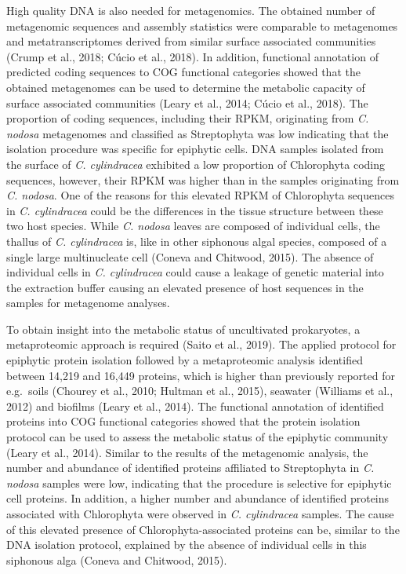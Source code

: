 \documentclass[12pt,]{article}
\begin{document}
High quality DNA is also needed for metagenomics. The obtained number of
metagenomic sequences and assembly statistics were comparable to
metagenomes and metatranscriptomes derived from similar surface
associated communities (Crump et al., 2018; Cúcio et al., 2018). In
addition, functional annotation of predicted coding sequences to COG
functional categories showed that the obtained metagenomes can be used
to determine the metabolic capacity of surface associated communities
(Leary et al., 2014; Cúcio et al., 2018). The proportion of coding
sequences, including their RPKM, originating from \emph{C. nodosa}
metagenomes and classified as Streptophyta was low indicating that the
isolation procedure was specific for epiphytic cells. DNA samples
isolated from the surface of \emph{C. cylindracea} exhibited a low
proportion of Chlorophyta coding sequences, however, their RPKM was
higher than in the samples originating from \emph{C. nodosa}. One of the
reasons for this elevated RPKM of Chlorophyta sequences in \emph{C.
cylindracea} could be the differences in the tissue structure between
these two host species. While \emph{C. nodosa} leaves are composed of
individual cells, the thallus of \emph{C. cylindracea} is, like in other
siphonous algal species, composed of a single large multinucleate cell
(Coneva and Chitwood, 2015). The absence of individual cells in \emph{C.
cylindracea} could cause a leakage of genetic material into the
extraction buffer causing an elevated presence of host sequences in the
samples for metagenome analyses.

To obtain insight into the metabolic status of uncultivated prokaryotes,
a metaproteomic approach is required (Saito et al., 2019). The applied
protocol for epiphytic protein isolation followed by a metaproteomic
analysis identified between 14,219 and 16,449 proteins, which is higher
than previously reported for e.g.~soils (Chourey et al., 2010; Hultman
et al., 2015), seawater (Williams et al., 2012) and biofilms (Leary et
al., 2014). The functional annotation of identified proteins into COG
functional categories showed that the protein isolation protocol can be
used to assess the metabolic status of the epiphytic community (Leary et
al., 2014). Similar to the results of the metagenomic analysis, the
number and abundance of identified proteins affiliated to Streptophyta
in \emph{C. nodosa} samples were low, indicating that the procedure is
selective for epiphytic cell proteins. In addition, a higher number and
abundance of identified proteins associated with Chlorophyta were
observed in \emph{C. cylindracea} samples. The cause of this elevated
presence of Chlorophyta-associated proteins can be, similar to the DNA
isolation protocol, explained by the absence of individual cells in this
siphonous alga (Coneva and Chitwood, 2015).
\end{document}
